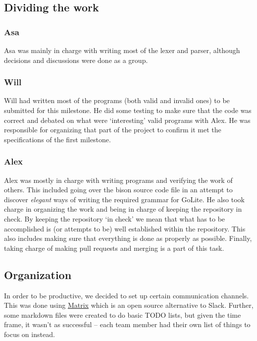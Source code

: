 \documentclass{article}
\begin{document}
\subsection{Dividing the work}


\subsubsection{Asa}

Asa was mainly in charge with writing most of the lexer and parser,
although decisions and discussions were done as a group.

\subsubsection{Will}


Will had written most of the programs (both valid and invalid ones) to be
submitted for this milestone. He did some testing to make sure that the code was
correct and debated on what were `interesting' valid programs with Alex.
 He was responsible for organizing that part of the project to confirm it
 met the specifications of the first milestone.

\subsubsection{Alex}


Alex was mostly in charge with writing programs and verifying the work of
others. This included going over the bison source code file in an attempt to discover
\textit{elegant} ways of writing the required grammar for GoLite. He also took
charge in organizing the work and being in charge of keeping the repository in check.
By keeping the repository `in check' we mean that what has to be accomplished is
(or attempts to be) well established within the repository. This also includes
making sure
that everything is done as properly as possible. Finally, taking charge
of making pull requests and merging is a part of this task.


\subsection{Organization}


In order to be productive, we decided to set up certain communication channels.
This was done using \href{https://matrix.org/}{Matrix} which is an open source
alternative to Slack. Further, some markdown files were created to do basic
TODO lists, but given the time frame, it wasn't as successful -- each team
member had their own list of things to focus on instead.

%
\end{document}
